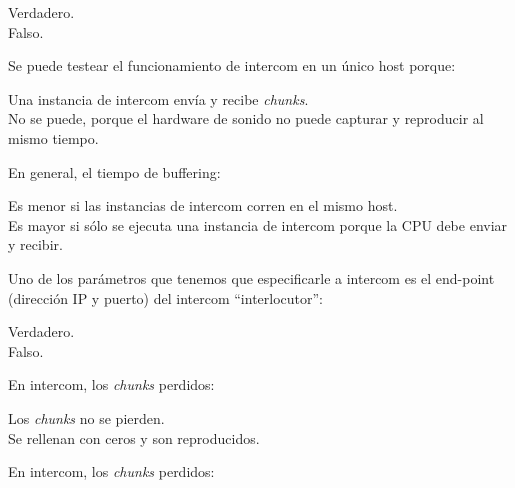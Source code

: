 \documentclass[legalpaper, 12pt, addpoints]{exam}
\begin{document}
\begin{questions}
\begin{oneparchoices}
  \choice Verdadero.\\
  \choice Falso.
\end{oneparchoices}
  
\vspace{0.10in}

\question Se puede testear el funcionamiento de intercom en un único host porque:

\begin{oneparchoices}
  \choice Una instancia de intercom envía y recibe \emph{chunks}.\\
  \choice No se puede, porque el hardware de sonido no puede capturar y reproducir al mismo tiempo.
\end{oneparchoices}
  
\vspace{0.10in}

\question En general, el tiempo de buffering:

\begin{oneparchoices}
  \choice Es menor si las instancias de intercom corren en el mismo host.\\
  \choice Es mayor si sólo se ejecuta una instancia de intercom porque la CPU debe enviar y recibir.
\end{oneparchoices}
  
\vspace{0.10in}

\question Uno de los parámetros que tenemos que especificarle a
intercom es el end-point (dirección IP y puerto) del intercom
``interlocutor'':

\begin{oneparchoices}
  \choice Verdadero.\\
  \choice Falso.
\end{oneparchoices}
  
\vspace{0.10in}

\question En intercom, los \emph{chunks} perdidos:

\begin{oneparchoices}
  \choice Los \emph{chunks} no se pierden.\\
  \choice Se rellenan con ceros y son reproducidos.
\end{oneparchoices}
  
\vspace{0.10in}

\question En intercom, los \emph{chunks} perdidos:


\end{questions}
\end{document}
